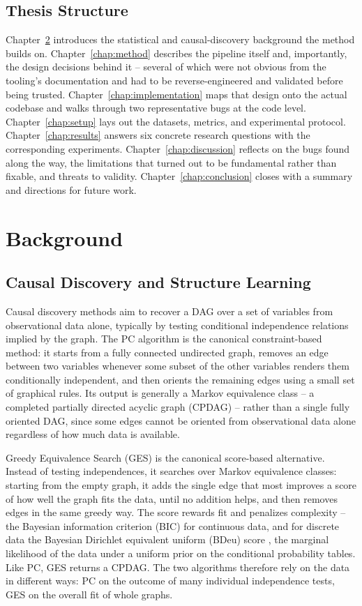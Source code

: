 \documentclass[
  english,
  class=report,
  accentcolor=2c,
  marginpar=false,
  parskip=half-,
  fontsize=11pt,
  ruledheaders=false,
  pdfa=false,
  IMRAD=false,
  thesis={type=master}
]{tudapub}
\begin{document}
\section{Thesis Structure}
Chapter~\ref{chap:background} introduces the statistical and causal-discovery
background the method builds on. Chapter~\ref{chap:method} describes the
pipeline itself and, importantly, the design decisions behind it --
several of which were not obvious from the tooling's documentation and had to
be reverse-engineered and validated before being trusted.
Chapter~\ref{chap:implementation} maps that design onto the actual codebase
and walks through two representative bugs at the code level.
Chapter~\ref{chap:setup} lays out the datasets, metrics, and experimental
protocol. Chapter~\ref{chap:results} answers six concrete research questions
with the corresponding experiments. Chapter~\ref{chap:discussion} reflects on
the bugs found along the way, the limitations that turned out to be
fundamental rather than fixable, and threats to validity.
Chapter~\ref{chap:conclusion} closes with a summary and directions for future
work.


\chapter{Background}
\label{chap:background}

\section{Causal Discovery and Structure Learning}
Causal discovery methods aim to recover a DAG over a set of variables from
observational data alone, typically by testing conditional independence
relations implied by the graph. The PC algorithm \parencite{spirtes2000} is
the canonical constraint-based method: it starts from a fully connected
undirected graph, removes an edge between two variables whenever some subset
of the other variables renders them conditionally independent, and then
orients the remaining edges using a small set of graphical rules. Its output
is generally a Markov equivalence class -- a completed partially directed
acyclic graph (CPDAG) -- rather than a single fully oriented DAG, since some
edges cannot be oriented from observational data alone regardless of how much
data is available.

Greedy Equivalence Search (GES) \parencite{chickering2002} is the canonical
score-based alternative. Instead of testing independences, it searches over
Markov equivalence classes: starting from the empty graph, it adds the
single edge that most improves a score of how well the graph fits the data,
until no addition helps, and then removes edges in the same greedy way. The
score rewards fit and penalizes complexity -- the Bayesian information
criterion (BIC) for continuous data, and for discrete data the Bayesian
Dirichlet equivalent uniform (BDeu) score \parencite{heckerman1995}, the
marginal likelihood of the data under a uniform prior on the conditional
probability tables. Like PC, GES returns a CPDAG. The two algorithms
therefore rely on the data in different ways: PC on the outcome of many
individual independence tests, GES on the overall fit of whole graphs.
\end{document}
